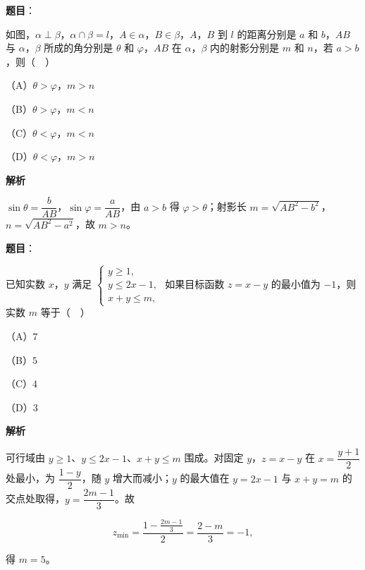 \begin{answer}

\textbf{题目}：

如图，$\alpha\perp\beta$，$\alpha\cap\beta=l$，$A\in\alpha$，$B\in\beta$，$A$，$B$ 到 $l$ 的距离分别是 $a$ 和 $b$，$AB$ 与 $\alpha$，$\beta$ 所成的角分别是 $\theta$ 和 $\varphi$，$AB$ 在 $\alpha$，$\beta$ 内的射影分别是 $m$ 和 $n$，若 $a>b$，则（　）
\nopagebreak[4]
\begin{center}\end{center}
\nopagebreak[4]
（A）$\theta>\varphi$，$m>n$

（B）$\theta>\varphi$，$m<n$

（C）$\theta<\varphi$，$m<n$

（D）$\theta<\varphi$，$m>n$

\textbf{解析}

$\sin\theta=\dfrac b{AB}$，$\sin\varphi=\dfrac a{AB}$，由 $a>b$ 得 $\varphi>\theta$；射影长 $m=\sqrt{AB^2-b^2}$，$n=\sqrt{AB^2-a^2}$，故 $m>n$。


\end{answer}
\begin{answer}

\textbf{题目}：

已知实数 $x$，$y$ 满足 $\begin{cases}y\geqslant1,\\ y\leqslant2x-1,\\ x+y\leqslant m,\end{cases}$ 如果目标函数 $z=x-y$ 的最小值为 $-1$，则实数 $m$ 等于（　）

（A）$7$

（B）$5$

（C）$4$

（D）$3$

\textbf{解析}

可行域由 $y\geqslant1$、$y\leqslant2x-1$、$x+y\leqslant m$ 围成。对固定 $y$，$z=x-y$ 在 $x=\dfrac{y+1}2$ 处最小，为 $\dfrac{1-y}2$，随 $y$ 增大而减小；$y$ 的最大值在 $y=2x-1$ 与 $x+y=m$ 的交点处取得，$y=\dfrac{2m-1}3$。故

\nopagebreak[4]
\[z_{\min}=\frac{1-\frac{2m-1}3}2=\frac{2-m}3=-1,\]

得 $m=5$。


\end{answer}
